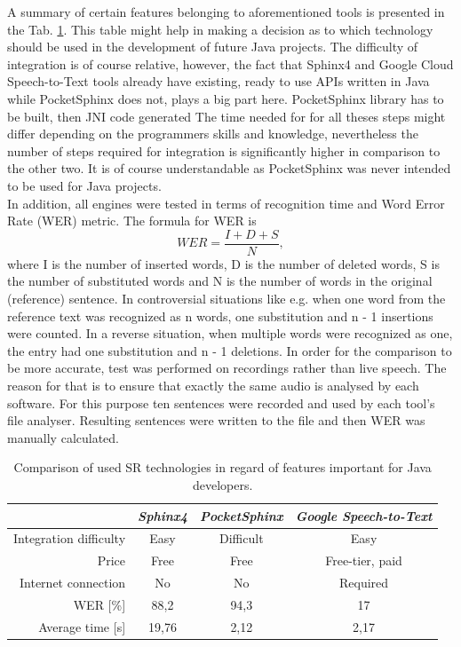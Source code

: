 A summary of certain features belonging to aforementioned tools is presented in the Tab. \ref{tab:comparisonSR}. This table might help in making a decision as to which technology should be used in the development of future Java projects. The difficulty of integration is of course relative, however, the fact that Sphinx4 and Google Cloud Speech-to-Text tools already have existing, ready to use APIs written in Java while PocketSphinx does not, plays a big part here. PocketSphinx library has to be built, then JNI code generated \etc The time needed for for all theses steps might differ depending on the programmers skills and knowledge, nevertheless the number of steps required for integration is significantly higher in comparison to the other two. It is of course understandable as PocketSphinx was never intended to be used for Java projects. \\
In addition, all engines were tested in terms of recognition time and Word Error Rate (WER) metric. The formula for WER is 
 $$   WER = \frac{I + D + S}{N}, $$
where I is the number of inserted words, D is the number of deleted words, S is the number of substituted words and N is the number of words in the original (reference) sentence. In controversial situations like e.g. when one word from the reference text was recognized as n words, one substitution and n - 1 insertions were counted. In a reverse situation, when multiple words were recognized as one, the entry had one substitution and n - 1 deletions. In order for the comparison to be more accurate, test was performed on recordings rather than live speech. The reason for that is to ensure that exactly the same audio is analysed by each software. For this purpose ten sentences were recorded and used by each tool's file analyser. Resulting sentences were written to the file and then WER was manually calculated. 

\begin{table}[hbt!]
    \caption{Comparison of used SR technologies in regard of features important for Java developers.}
    \label{tab:comparisonSR}
    \centering
    \setlength{\textwidth}{5mm} %
    \def\arraystretch{1.25} %
    \begin{tabular}{|r||c|c|c|}
        \hline
        & \emph{Sphinx4} & \emph{PocketSphinx} & \emph{Google Speech-to-Text} \\
        \hline
        \hline
        Integration difficulty & Easy & Difficult & Easy \\
        \hline
        Price & Free & Free & Free-tier, paid \\
        \hline
        Internet connection & No & No & Required \\
        \hline
        WER [\%] &  88,2 & 94,3 & 17  \\
        \hline
        Average time [s] &  19,76 & 2,12 & 2,17 \\
        \hline
    \end{tabular}
\end{table}

